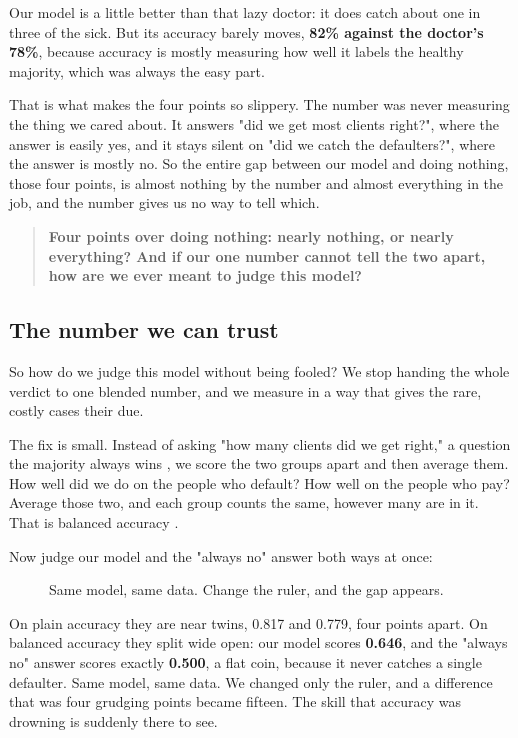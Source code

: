 \documentclass[11pt]{article} %
\begin{document}
Our model is a little better than that lazy doctor: it does catch about one in three of the sick. But its accuracy barely moves, \textbf{82\% against the doctor's 78\%}, because accuracy is mostly measuring how well it labels the healthy majority, which was always the easy part.

That is what makes the four points so slippery. The number was never measuring the thing we cared about. It answers "did we get most clients right?", where the answer is easily yes, and it stays silent on "did we catch the defaulters?", where the answer is mostly no. So the entire gap between our model and doing nothing, those four points, is almost nothing by the number and almost everything in the job, and the number gives us no way to tell which.


\begin{quote}
\textbf{Four points over doing nothing: nearly nothing, or nearly everything? And if our one number cannot tell the two apart, how are we ever meant to judge this model?}
\end{quote}



\subsection{The number we can trust}


So how do we judge this model without being fooled? We stop handing the whole verdict to one blended number, and we measure in a way that gives the rare, costly cases their due.

The fix is small. Instead of asking "how many clients did we get right," a question the majority always wins \cite{provost:1998}, we score the two groups apart and then average them. How well did we do on the people who default? How well on the people who pay? Average those two, and each group counts the same, however many are in it. That is balanced accuracy \cite{brodersen:2010}.

Now judge our model and the "always no" answer both ways at once:

\begin{figure}[htbp]
\centering

\caption{Same model, same data. Change the ruler, and the gap appears.}
\end{figure}


On plain accuracy they are near twins, 0.817 and 0.779, four points apart. On balanced accuracy they split wide open: our model scores \textbf{0.646}, and the "always no" answer scores exactly \textbf{0.500}, a flat coin, because it never catches a single defaulter. Same model, same data. We changed only the ruler, and a difference that was four grudging points became fifteen. The skill that accuracy was drowning is suddenly there to see.
\end{document}

